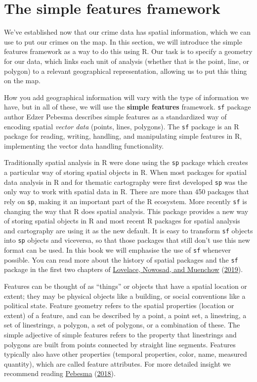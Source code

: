 \documentclass[
  krantz2]{krantz}
\begin{document}
\hypertarget{the-simple-features-framework}{%
\section{The simple features framework}\label{the-simple-features-framework}}

We've established now that our crime data has spatial information, which we can use to put our crimes on the map. In this section, we will introduce the simple features framework as a way to do this using R. Our task is to specify a geometry for our data, which links each unit of analysis (whether that is the point, line, or polygon) to a relevant geographical representation, allowing us to put this thing on the map.

How you add geographical information will vary with the type of information we have, but in all of these, we will use the \textbf{simple features} framework. \texttt{sf} package author Edzer Pebesma describes simple features as a standardized way of encoding spatial \emph{vector data} (points, lines, polygons). The \texttt{sf} package is an R package for reading, writing, handling, and manipulating simple features in R, implementing the vector data handling functionality.

Traditionally spatial analysis in R were done using the \texttt{sp} package which creates a particular way of storing spatial objects in R. When most packages for spatial data analysis in R and for thematic cartography were first developed \texttt{sp} was the only way to work with spatial data in R. There are more than 450 packages that rely on \texttt{sp}, making it an important part of the R ecosystem. More recently \texttt{sf} is changing the way that R does spatial analysis. This package provides a new way of storing spatial objects in R and most recent R packages for spatial analysis and cartography are using it as the new default. It is easy to transform \texttt{sf} objects into \texttt{sp} objects and viceversa, so that those packages that still don't use this new format can be used. In this book we will emphasise the use of \texttt{sf} whenever possible. You can read more about the history of spatial packages and the \texttt{sf} package in the first two chapters of \protect\hyperlink{ref-Lovelace_2019}{Lovelace, Nowosad, and Muenchow} (\protect\hyperlink{ref-Lovelace_2019}{2019}).

Features can be thought of as ``things'' or objects that have a spatial location or extent; they may be physical objects like a building, or social conventions like a political state. Feature geometry refers to the spatial properties (location or extent) of a feature, and can be described by a point, a point set, a linestring, a set of linestrings, a polygon, a set of polygons, or a combination of these. The simple adjective of simple features refers to the property that linestrings and polygons are built from points connected by straight line segments. Features typically also have other properties (temporal properties, color, name, measured quantity), which are called feature attributes. For more detailed insight we recommend reading \protect\hyperlink{ref-Pebesma_2018}{Pebesma} (\protect\hyperlink{ref-Pebesma_2018}{2018}).
\end{document}
